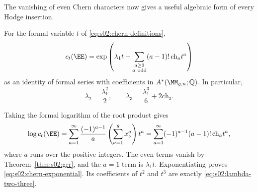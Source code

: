 The vanishing of even Chern characters now gives a useful algebraic
form of every Hodge insertion.

\begin{lmm}
\label{lmm:s02:chern-exponential}
For the formal variable $t$ of \eqref{eq:s02:chern-definitions},
\begin{equation}
\label{eq:s02:chern-exponential}
c_t(\EE)=\exp\left(
\lambda_1t+
\sum_{\substack{a\geq3\\a\ \mathrm{odd}}}
(a-1)!\,\mathrm{ch}_a t^a\right)
\end{equation}
as an identity of formal series with coefficients in
$A^*(\MM_{g,n};\mathbb Q)$.  In particular,
\begin{equation}
\label{eq:s02:lambda-two-three}
\lambda_2=\frac{\lambda_1^2}{2},
\qquad
\lambda_3=\frac{\lambda_1^3}{6}+2\mathrm{ch}_3.
\end{equation}
\end{lmm}

\begin{prf}
Taking the formal logarithm of the root product gives
\[
\log c_t(\EE)
=\sum_{a=1}^{\infty}\frac{(-1)^{a-1}}{a}
\left(\sum_{\nu=1}^g x_\nu^a\right)t^a
=\sum_{a=1}^{\infty}(-1)^{a-1}(a-1)!\,
\mathrm{ch}_a t^a,
\]
where $a$ runs over the positive integers.  The even terms vanish by
Theorem~\ref{thm:s02:grr}, and the $a=1$ term is $\lambda_1t$.
Exponentiating proves \eqref{eq:s02:chern-exponential}.  Its
coefficients of $t^2$ and $t^3$ are exactly
\eqref{eq:s02:lambda-two-three}.
\end{prf}
